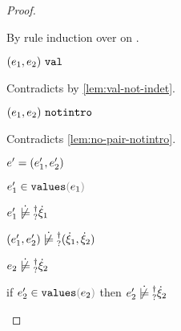 \begin{proof}
\begin{byCases}
\begin{byCases}
\begin{byCases}
\begin{byCases}
\begin{byCases}
            By rule induction over  on .
            \begin{byCases}
              \item[\text{(\ref{rule:IVVal})}]
              \begin{pfsteps*}
              \item $(e_1 , e_2) ~\mathtt{val}$ 
              \end{pfsteps*} 
              Contradicts  by \autoref{lem:val-not-indet}.
              \item[\text{(\ref{rule:IVIndet})}] 
              \begin{pfsteps*}
              \item $(e_1 , e_2) ~\mathtt{notintro}$ 
              \end{pfsteps*}
              Contradicts \autoref{lem:no-pair-notintro}.
              \item[\text{(\ref{rule:IVPair})}]
              \begin{pfsteps*}
              \item $e'=(e_1' , e_2')$ 
              \item $\inValues{e_1'}{e_1}$  
              \item $\cnotsatisfyormay{e_1'}{\hxi_1}$  
              \item $\cnotsatisfyormay{\hpair{e_1'}{e_2'}}{\cpair{\hxi_1}{\hxi_2}}$ 
              \end{pfsteps*} 
            \end{byCases}
            \item[\cnotsatisfyormay{e_2}{\hxi_2}]
            \begin{pfsteps*}
            \item $\cnotsatisfyormay{e_2}{\hxi_2}$  
            \item if $\inValues{e_2'}{e_2}$ then $\cnotsatisfyormay{e_2'}{\hxi_2}$  
            \end{pfsteps*}

\end{byCases}
\end{byCases}
\end{byCases}
\end{byCases}
\end{byCases}
\end{proof}
